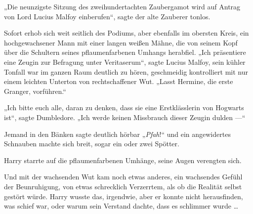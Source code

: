 „Die neunzigste Sitzung des zweihundertachten Zaubergamot wird auf Antrag von Lord Lucius Malfoy einberufen“, sagte der alte Zauberer tonlos.

Sofort erhob sich weit seitlich des Podiums, aber ebenfalls im obersten Kreis, ein hochgewachsener Mann mit einer langen weißen Mähne, die von seinem Kopf über die Schultern seines pflaumenfarbenen Umhangs herabfiel.
„Ich präsentiere eine Zeugin zur Befragung unter Veritaserum“, sagte Lucius Malfoy, sein kühler Tonfall war im ganzen Raum deutlich zu hören, geschmeidig kontrolliert mit nur einem leichten Unterton von rechtschaffener Wut.
„Lasst Hermine, die erste Granger, vorführen.“

„Ich bitte euch alle, daran zu denken, dass sie eine Erstklässlerin von Hogwarts ist“, sagte Dumbledore.
„Ich werde keinen Missbrauch dieser Zeugin dulden —“

Jemand in den Bänken sagte deutlich hörbar
„\emph{Pfah}!“ und ein angewidertes Schnauben machte sich breit, sogar ein oder zwei Spötter.

Harry starrte auf die pflaumenfarbenen Umhänge, seine Augen verengten sich.

Und mit der wachsenden Wut kam noch etwas anderes, ein wachsendes Gefühl der Beunruhigung, von etwas schrecklich Verzerrtem, als ob die Realität selbst gestört würde. Harry wusste das, irgendwie, aber er konnte nicht herausfinden, was schief war, oder warum sein Verstand dachte, dass es schlimmer wurde …

